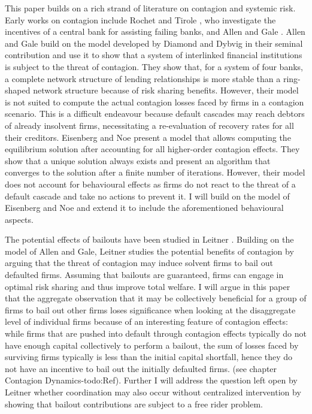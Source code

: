 \documentclass[12pt,a4paper]{article}
\begin{document}
This paper builds on a rich strand of literature on contagion and systemic risk. Early works on contagion include Rochet and Tirole \cite{Roc96}, who investigate the incentives of a central bank for assisting failing banks, and Allen and Gale \cite{All00}. Allen and Gale build on the model developed by Diamond and Dybvig \cite{Dia83} in their seminal contribution and use it to show that a system of interlinked financial institutions is subject to the threat of contagion. They show that, for a system of four banks, a complete network structure of lending relationships is more stable than a ring-shaped network structure because of risk sharing benefits. However, their model is not suited to compute the actual contagion losses faced by firms in a contagion scenario. This is a difficult endeavour because default cascades may reach debtors of already insolvent firms, necessitating a re-evaluation of recovery rates for all their creditors. Eisenberg and Noe \cite{Eis01} present a model that allows computing the equilibrium solution after accounting for all higher-order contagion effects. They show that a unique solution always exists and present an algorithm that converges to the solution after a finite number of iterations. However, their model does not account for behavioural effects as firms do not react to the threat of a default cascade and take no actions to prevent it. I will build on the model of Eisenberg and Noe and extend it to include the aforementioned behavioural aspects.

The potential effects of bailouts have been studied in Leitner \cite{Lei05}. Building on the model of Allen and Gale, Leitner studies the potential benefits of contagion by arguing that the threat of contagion may induce solvent firms to bail out defaulted firms. Assuming that bailouts are guaranteed, firms can engage in optimal risk sharing and thus improve total welfare. I will argue in this paper that the aggregate observation that it may be collectively beneficial for a group of firms to bail out other firms loses significance when looking at the disaggregate level of individual firms because of an interesting feature of contagion effects: while firms that are pushed into default through contagion effects typically do not have enough capital collectively to perform a bailout, the sum of losses faced by surviving firms typically is less than the initial capital shortfall, hence they do not have an incentive to bail out the initially defaulted firms. (see chapter Contagion Dynamics-todo:Ref). Further I will address the question left open by Leitner whether coordination may also occur without centralized intervention by showing that bailout contributions are subject to a free rider problem.
\end{document}
